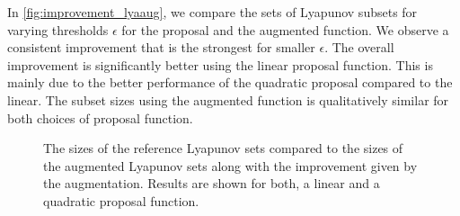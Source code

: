 In \autoref{fig:improvement_lyaaug}, we compare the sets of Lyapunov subsets for varying thresholds $\epsilon$ for the proposal and the augmented function.
We observe a consistent improvement that is the strongest for smaller $\epsilon$.
The overall improvement is significantly better using the linear proposal function.
This is mainly due to the better performance of the quadratic proposal compared to the linear.
The subset sizes using the augmented function is qualitatively similar for both choices of proposal function.
\begin{figure}[htb]
	\centering
    \caption[Subset sizes using Lyapunov-Augmentation]{\label{fig:improvement_lyaaug}The sizes of the reference Lyapunov sets compared to the sizes of the augmented Lyapunov sets along with the improvement given by the augmentation. Results are shown for both, a linear and a quadratic proposal function.}
\end{figure}

